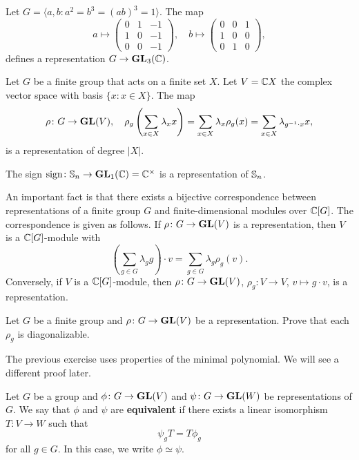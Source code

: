 \begin{example}
  Let $G=\langle a,b:a^2=b^3=(ab)^3=1\rangle$. The map 
  \[
    a\mapsto\begin{pmatrix}
    0 & 1 & -1\\
    1 & 0 & -1\\
    0 & 0 & -1
    \end{pmatrix},
    \quad
    b\mapsto\begin{pmatrix}
      0 & 0 & 1\\
      1 & 0 & 0\\
      0 & 1 & 0
    \end{pmatrix},
  \]
  defines a representation $G\to\mathbf{GL}_3(\mathbb{C})$. 
\end{example}

\begin{example}
  Let $G$ be a finite group that acts on a finite set $X$. 
  Let $V=\mathbb{C} X$ the complex vector space with basis $\{x:x\in
  X\}$. The map 
  \[
	\rho\colon G\to\mathbf{GL}(V),\quad
	\rho_g\left(\sum_{x\in X}\lambda_x x\right)
	=\sum_{x\in X}\lambda_x\rho_g(x)
	=\sum_{x\in X}\lambda_{g^{-1}\cdot x}x, 
  \]
  is a representation of degree $|X|$.
\end{example}

\begin{example}
    The sign $\operatorname{sign}\colon\mathbb{S}_n\to\mathbf{GL}_1(\mathbb{C})=\mathbb{C}^{\times}$ is a representation of $\mathbb{S}_n$.
\end{example}

An important fact is that there exists a bijective
correspondence 
between 
representations of a finite group $G$ 
and 
finite-dimensional modules over $\mathbb{C}[G]$. The correspondence
is given as follows. If $\rho\colon G\to\mathbf{GL}(V)$ is a representation, 
then $V$ is a $\mathbb{C}[G]$-module with
\[
\left(\sum_{g\in G}\lambda_gg\right)\cdot v=\sum_{g\in G}\lambda_g\rho_g(v).
\]
Conversely, if $V$ is a $\mathbb{C}[G]$-module, then
$\rho\colon G\to\mathbf{GL}(V)$, $\rho_g\colon V\to V$, $v\mapsto g\cdot v$, 
is a representation. 

\begin{exercise}
    Let $G$ be a finite group and 
    $\rho\colon G\to\mathbf{GL}(V)$ be a representation. Prove that 
    each $\rho_g$ is diagonalizable. 
\end{exercise}

The previous exercise uses properties of the minimal polynomial. We will 
see a different proof later. 

\begin{definition}
Let $G$ be a group and $\phi\colon G\to\mathbf{GL}(V)$ and $\psi\colon G\to\mathbf{GL}(W)$ be representations of $G$. 
We say that $\phi$ and $\psi$ are \textbf{equivalent} if 
there exists a linear isomorphism $T\colon V\to W$ such that 
\[
	\psi_g T=T \phi_g
\]
for all $g\in G$. In this case, we write $\phi\simeq\psi$. 
\end{definition}

